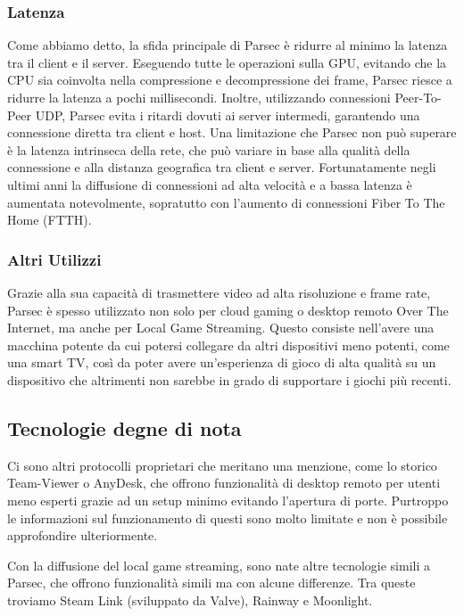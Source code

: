 \documentclass[12pt,a4paper,openright,twoside]{book}
\begin{document}
\subsubsection{Latenza}
\label{sec:latenza-parsec}

Come abbiamo detto, la sfida principale di Parsec è ridurre al minimo la latenza tra il client e il server. Eseguendo tutte le operazioni sulla GPU, evitando che la CPU sia coinvolta nella compressione e decompressione dei frame, Parsec riesce a ridurre la latenza a pochi millisecondi. Inoltre, utilizzando connessioni Peer-To-Peer UDP, Parsec evita i ritardi dovuti ai server intermedi, garantendo una connessione diretta tra client e host. Una limitazione che Parsec non può superare è la latenza intrinseca della rete, che può variare in base alla qualità della connessione e alla distanza geografica tra client e server. Fortunatamente negli ultimi anni la diffusione di connessioni ad alta velocità e a bassa latenza è aumentata notevolmente, sopratutto con l'aumento di connessioni Fiber To The Home (FTTH).

\subsubsection{Altri Utilizzi}
Grazie alla sua capacità di trasmettere video ad alta risoluzione e frame rate, Parsec è spesso utilizzato non solo per cloud gaming o desktop remoto Over The Internet, ma anche per Local Game Streaming. Questo consiste nell'avere una macchina potente da cui potersi collegare da altri dispositivi meno potenti, come una smart TV, così da poter avere un'esperienza di gioco di alta qualità su un dispositivo che altrimenti non sarebbe in grado di supportare i giochi più recenti.

\subsection{Tecnologie degne di nota}
Ci sono altri protocolli proprietari che meritano una menzione, come lo storico Team-Viewer o AnyDesk, che offrono funzionalità di desktop remoto per utenti meno esperti grazie ad un setup minimo evitando l'apertura di porte. Purtroppo le informazioni sul funzionamento di questi sono molto limitate e non è possibile approfondire ulteriormente.

Con la diffusione del local game streaming, sono nate altre tecnologie simili a Parsec, che offrono funzionalità simili ma con alcune differenze. Tra queste troviamo Steam Link (sviluppato da Valve), Rainway e Moonlight.
\end{document}
